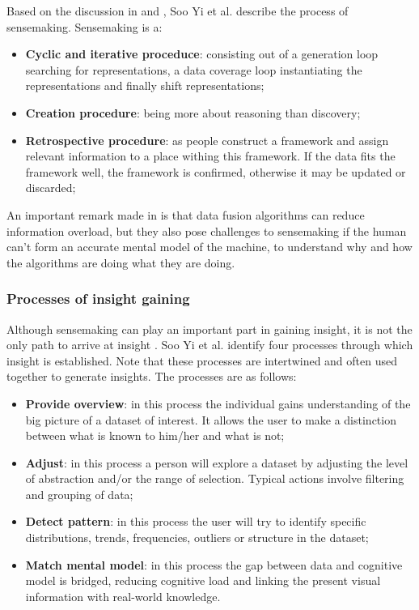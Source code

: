 Based on the discussion in \cite{klein:2006:MSS:1175882.1176017} and \cite{yi:2008}, Soo Yi et al. describe the process of sensemaking. Sensemaking is a:

\begin{itemize}
	\item \textbf{Cyclic and iterative proceduce}: consisting out of a generation loop searching for representations, a data coverage loop instantiating the representations and finally shift representations;
	\item \textbf{Creation procedure}: being more about reasoning than discovery;
	\item \textbf{Retrospective procedure}: as people construct a framework and assign relevant information to a place withing this framework. If the data fits the framework well, the framework is confirmed, otherwise it may be updated or discarded;
\end{itemize}

An important remark made in \cite{Klein:2006:MSS:1158821.1159015} is that data fusion algorithms can reduce information overload, but they also pose challenges to sensemaking if the human can't form an accurate mental model of the machine, to understand why and how the algorithms are doing what they are doing.


\subsubsection{Processes of insight gaining}\label{chapter:literature_study:section:user:subsection:insight:subsubsection:processes}

Although sensemaking can play an important part in gaining insight, it is not the only path to arrive at insight \cite{yi:2008}. Soo Yi et al. \cite{yi:2008} identify four processes through which insight is established. Note that these processes are intertwined and often used together to generate insights. The processes are as follows\cite{yi:2008}:

\begin{itemize}
	\item \textbf{Provide overview}: in this process the individual gains understanding of the big picture of a dataset of interest. It allows the user to make a distinction between what is known to him/her and what is not;
	\item \textbf{Adjust}: in this process a person will explore a dataset by adjusting the level of abstraction and/or the range of selection. Typical actions involve filtering and grouping of data;
	\item \textbf{Detect pattern}: in this process the user will try to identify specific distributions, trends, frequencies, outliers or structure in the dataset;
	\item \textbf{Match mental model}: in this process the gap between data and cognitive model is bridged, reducing cognitive load and linking the present visual information with real-world knowledge.
\end{itemize}

